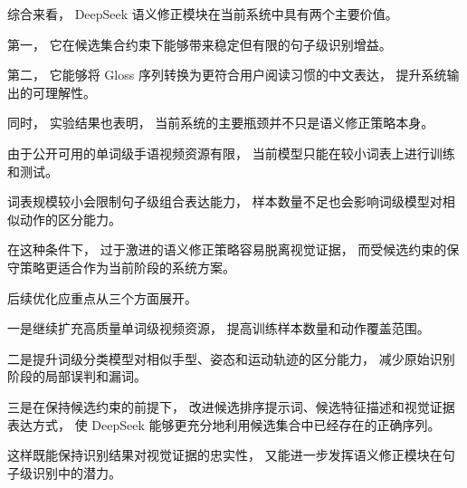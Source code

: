综合来看，
DeepSeek 语义修正模块在当前系统中具有两个主要价值。

第一，
它在候选集合约束下能够带来稳定但有限的句子级识别增益。

第二，
它能够将 Gloss 序列转换为更符合用户阅读习惯的中文表达，
提升系统输出的可理解性。

同时，
实验结果也表明，
当前系统的主要瓶颈并不只是语义修正策略本身。

由于公开可用的单词级手语视频资源有限，
当前模型只能在较小词表上进行训练和测试。

词表规模较小会限制句子级组合表达能力，
样本数量不足也会影响词级模型对相似动作的区分能力。

在这种条件下，
过于激进的语义修正策略容易脱离视觉证据，
而受候选约束的保守策略更适合作为当前阶段的系统方案。

后续优化应重点从三个方面展开。

一是继续扩充高质量单词级视频资源，
提高训练样本数量和动作覆盖范围。

二是提升词级分类模型对相似手型、姿态和运动轨迹的区分能力，
减少原始识别阶段的局部误判和漏词。

三是在保持候选约束的前提下，
改进候选排序提示词、候选特征描述和视觉证据表达方式，
使 DeepSeek 能够更充分地利用候选集合中已经存在的正确序列。

这样既能保持识别结果对视觉证据的忠实性，
又能进一步发挥语义修正模块在句子级识别中的潜力。